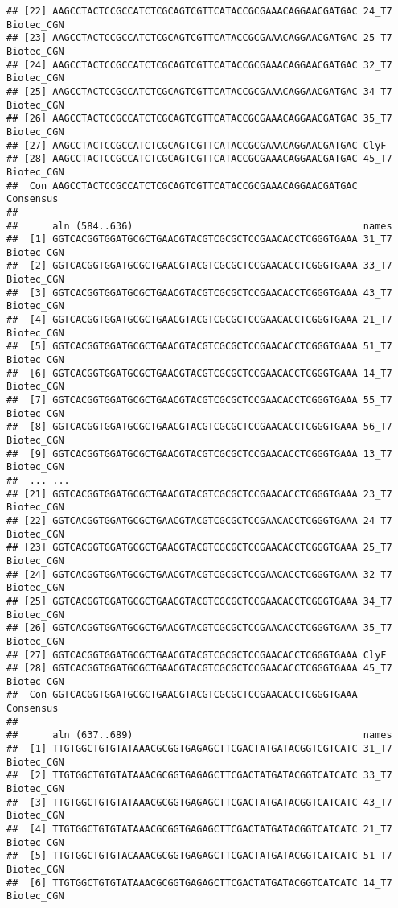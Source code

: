 \documentclass[
]{article}
\begin{document}
\begin{verbatim}
## [22] AAGCCTACTCCGCCATCTCGCAGTCGTTCATACCGCGAAACAGGAACGATGAC 24_T7 Biotec_CGN
## [23] AAGCCTACTCCGCCATCTCGCAGTCGTTCATACCGCGAAACAGGAACGATGAC 25_T7 Biotec_CGN
## [24] AAGCCTACTCCGCCATCTCGCAGTCGTTCATACCGCGAAACAGGAACGATGAC 32_T7 Biotec_CGN
## [25] AAGCCTACTCCGCCATCTCGCAGTCGTTCATACCGCGAAACAGGAACGATGAC 34_T7 Biotec_CGN
## [26] AAGCCTACTCCGCCATCTCGCAGTCGTTCATACCGCGAAACAGGAACGATGAC 35_T7 Biotec_CGN
## [27] AAGCCTACTCCGCCATCTCGCAGTCGTTCATACCGCGAAACAGGAACGATGAC ClyF
## [28] AAGCCTACTCCGCCATCTCGCAGTCGTTCATACCGCGAAACAGGAACGATGAC 45_T7 Biotec_CGN
##  Con AAGCCTACTCCGCCATCTCGCAGTCGTTCATACCGCGAAACAGGAACGATGAC Consensus 
## 
##      aln (584..636)                                        names
##  [1] GGTCACGGTGGATGCGCTGAACGTACGTCGCGCTCCGAACACCTCGGGTGAAA 31_T7 Biotec_CGN
##  [2] GGTCACGGTGGATGCGCTGAACGTACGTCGCGCTCCGAACACCTCGGGTGAAA 33_T7 Biotec_CGN
##  [3] GGTCACGGTGGATGCGCTGAACGTACGTCGCGCTCCGAACACCTCGGGTGAAA 43_T7 Biotec_CGN
##  [4] GGTCACGGTGGATGCGCTGAACGTACGTCGCGCTCCGAACACCTCGGGTGAAA 21_T7 Biotec_CGN
##  [5] GGTCACGGTGGATGCGCTGAACGTACGTCGCGCTCCGAACACCTCGGGTGAAA 51_T7 Biotec_CGN
##  [6] GGTCACGGTGGATGCGCTGAACGTACGTCGCGCTCCGAACACCTCGGGTGAAA 14_T7 Biotec_CGN
##  [7] GGTCACGGTGGATGCGCTGAACGTACGTCGCGCTCCGAACACCTCGGGTGAAA 55_T7 Biotec_CGN
##  [8] GGTCACGGTGGATGCGCTGAACGTACGTCGCGCTCCGAACACCTCGGGTGAAA 56_T7 Biotec_CGN
##  [9] GGTCACGGTGGATGCGCTGAACGTACGTCGCGCTCCGAACACCTCGGGTGAAA 13_T7 Biotec_CGN 
##  ... ...
## [21] GGTCACGGTGGATGCGCTGAACGTACGTCGCGCTCCGAACACCTCGGGTGAAA 23_T7 Biotec_CGN
## [22] GGTCACGGTGGATGCGCTGAACGTACGTCGCGCTCCGAACACCTCGGGTGAAA 24_T7 Biotec_CGN
## [23] GGTCACGGTGGATGCGCTGAACGTACGTCGCGCTCCGAACACCTCGGGTGAAA 25_T7 Biotec_CGN
## [24] GGTCACGGTGGATGCGCTGAACGTACGTCGCGCTCCGAACACCTCGGGTGAAA 32_T7 Biotec_CGN
## [25] GGTCACGGTGGATGCGCTGAACGTACGTCGCGCTCCGAACACCTCGGGTGAAA 34_T7 Biotec_CGN
## [26] GGTCACGGTGGATGCGCTGAACGTACGTCGCGCTCCGAACACCTCGGGTGAAA 35_T7 Biotec_CGN
## [27] GGTCACGGTGGATGCGCTGAACGTACGTCGCGCTCCGAACACCTCGGGTGAAA ClyF
## [28] GGTCACGGTGGATGCGCTGAACGTACGTCGCGCTCCGAACACCTCGGGTGAAA 45_T7 Biotec_CGN
##  Con GGTCACGGTGGATGCGCTGAACGTACGTCGCGCTCCGAACACCTCGGGTGAAA Consensus 
## 
##      aln (637..689)                                        names
##  [1] TTGTGGCTGTGTATAAACGCGGTGAGAGCTTCGACTATGATACGGTCGTCATC 31_T7 Biotec_CGN
##  [2] TTGTGGCTGTGTATAAACGCGGTGAGAGCTTCGACTATGATACGGTCATCATC 33_T7 Biotec_CGN
##  [3] TTGTGGCTGTGTATAAACGCGGTGAGAGCTTCGACTATGATACGGTCATCATC 43_T7 Biotec_CGN
##  [4] TTGTGGCTGTGTATAAACGCGGTGAGAGCTTCGACTATGATACGGTCATCATC 21_T7 Biotec_CGN
##  [5] TTGTGGCTGTGTACAAACGCGGTGAGAGCTTCGACTATGATACGGTCATCATC 51_T7 Biotec_CGN
##  [6] TTGTGGCTGTGTATAAACGCGGTGAGAGCTTCGACTATGATACGGTCATCATC 14_T7 Biotec_CGN

\end{verbatim}
\end{document}
